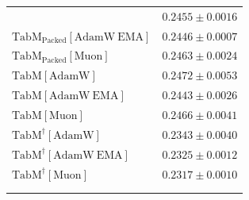 \begin{longtable}{p{}p{}}
{\begin{tabular}{ll}
{\footnotesize $\mathrm{TabM_{\text{Packed}}[AdamW]}$ } & {\footnotesize$0.2455 \pm 0.0016$}\\ 
{\footnotesize $\mathrm{TabM_{\text{Packed}}[AdamW\ EMA]}$ } & {\footnotesize$0.2446 \pm 0.0007$}\\ 
{\footnotesize $\mathrm{TabM_{\text{Packed}}[Muon]}$ } & {\footnotesize$0.2463 \pm 0.0024$}\\ 
{\footnotesize $\mathrm{TabM[AdamW]}$ } & {\footnotesize$0.2472 \pm 0.0053$}\\ 
{\footnotesize $\mathrm{TabM[AdamW\ EMA]}$ } & {\footnotesize$0.2443 \pm 0.0026$}\\ 
{\footnotesize $\mathrm{TabM[Muon]}$ } & {\footnotesize$0.2466 \pm 0.0041$}\\ 
{\footnotesize $\mathrm{TabM^\dagger[AdamW]}$ } & {\footnotesize$0.2343 \pm 0.0040$}\\ 
{\footnotesize $\mathrm{TabM^\dagger[AdamW\ EMA]}$ } & {\footnotesize$0.2325 \pm 0.0012$}\\ 
{\footnotesize $\mathrm{TabM^\dagger[Muon]}$ } & {\footnotesize$0.2317 \pm 0.0010$}\\ 
\bottomrule
\end{tabular}}

\\
\topalign{
\centering
\setlength\tabcolsep{2.5pt}
\renewcommand{\arraystretch}{0.8}
\begin{tabular}{ll}


\end{tabular}}
\end{longtable}
